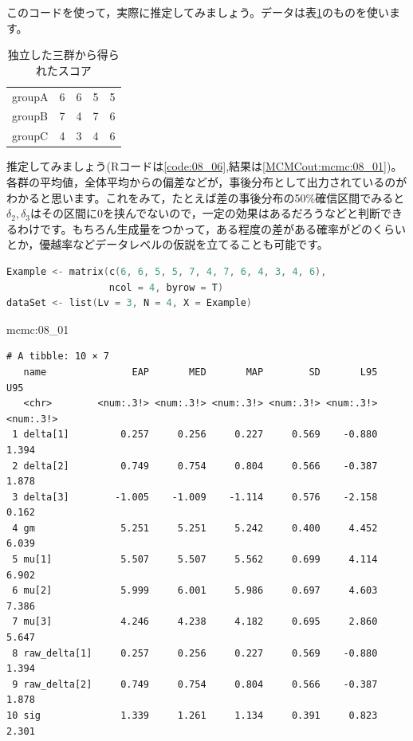 \documentclass{ltjsbook}
\begin{document}
このコードを使って，実際に推定してみましょう。データは表\ref{tbl:08_01}のものを使います。
\begin{table}[ht]
	\begin{center}
		\caption{独立した三群から得られたスコア}
		\begin{tabular}{l|llll}\hline
			groupA & 6 & 6 & 5 & 5 \\
			groupB & 7 & 4 & 7 & 6 \\
			groupC & 4 & 3 & 4 & 6 \\\hline
		\end{tabular}
		\label{tbl:08_01}
	\end{center}
\end{table}

推定してみましょう(Rコードは\ref{code:08_06},結果は\ref{MCMCout:mcmc:08_01})。
各群の平均値，全体平均からの偏差などが，事後分布として出力されているのがわかると思います。これをみて，たとえば差の事後分布の50\%確信区間でみると$\delta_2,\delta_3$はその区間に0を挟んでないので，一定の効果はあるだろうなどと判断できるわけです。もちろん生成量をつかって，ある程度の差がある確率がどのくらいとか，優越率などデータレベルの仮説を立てることも可能です。

\begin{lstlisting}[language=c++,label={code:08_06},caption={三群の平均値の比較}]
Example <- matrix(c(6, 6, 5, 5, 7, 4, 7, 6, 4, 3, 4, 6), 
                  ncol = 4, byrow = T)
dataSet <- list(Lv = 3, N = 4, X = Example)
\end{lstlisting}

\begin{MCMCout}{}{mcmc:08_01}
	\begin{verbatim}
# A tibble: 10 × 7
   name               EAP       MED       MAP        SD       L95       U95
   <chr>        <num:.3!> <num:.3!> <num:.3!> <num:.3!> <num:.3!> <num:.3!>
 1 delta[1]         0.257     0.256     0.227     0.569    -0.880     1.394
 2 delta[2]         0.749     0.754     0.804     0.566    -0.387     1.878
 3 delta[3]        -1.005    -1.009    -1.114     0.576    -2.158     0.162
 4 gm               5.251     5.251     5.242     0.400     4.452     6.039
 5 mu[1]            5.507     5.507     5.562     0.699     4.114     6.902
 6 mu[2]            5.999     6.001     5.986     0.697     4.603     7.386
 7 mu[3]            4.246     4.238     4.182     0.695     2.860     5.647
 8 raw_delta[1]     0.257     0.256     0.227     0.569    -0.880     1.394
 9 raw_delta[2]     0.749     0.754     0.804     0.566    -0.387     1.878
10 sig              1.339     1.261     1.134     0.391     0.823     2.301
\end{verbatim}
\end{MCMCout}
\end{document}
